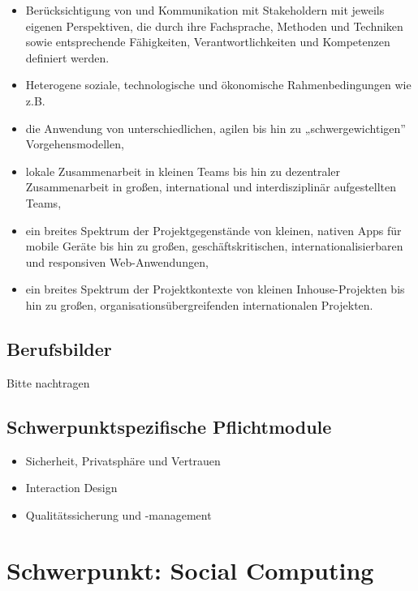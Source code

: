 \begin{itemize}
\tightlist
\item
  Berücksichtigung von und Kommunikation mit Stakeholdern mit jeweils
  eigenen Perspektiven, die durch ihre Fachsprache, Methoden und
  Techniken sowie entsprechende Fähigkeiten, Verantwortlichkeiten und
  Kompetenzen definiert werden.
\item
  Heterogene soziale, technologische und ökonomische Rahmenbedingungen
  wie z.B.
\item
  die Anwendung von unterschiedlichen, agilen bis hin zu
  „schwergewichtigen'' Vorgehensmodellen,
\item
  lokale Zusammenarbeit in kleinen Teams bis hin zu dezentraler
  Zusammenarbeit in großen, international und interdisziplinär
  aufgestellten Teams,
\item
  ein breites Spektrum der Projektgegenstände von kleinen, nativen Apps
  für mobile Geräte bis hin zu großen, geschäftskritischen,
  internationalisierbaren und responsiven Web-Anwendungen,
\item
  ein breites Spektrum der Projektkontexte von kleinen Inhouse-Projekten
  bis hin zu großen, organisationsübergreifenden internationalen
  Projekten.
\end{itemize}

\section*{Berufsbilder}\label{berufsbilder-1}

Bitte nachtragen

\section*{Schwerpunktspezifische
Pflichtmodule}\label{schwerpunktspezifische-pflichtmodule-1}

\begin{itemize}
\tightlist
\item
  Sicherheit, Privatsphäre und Vertrauen
\item
  Interaction Design
\item
  Qualitätssicherung und -management
\end{itemize}

\chapter{Schwerpunkt: Social
Computing}\label{schwerpunkt-social-computing}

